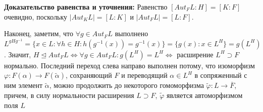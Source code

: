 \par \textbf{Доказательство равенства и уточнения:} \Proof Равенство $[Aut_F L : H] = [K : F]$ очевидно,
поскольку $|Aut_K L|=[L:K]$ и $|Aut_F L| =[L:F]$. 

\par Наконец, заметим, что $\forall g \in Aut_F L$
выполнено $L^{gHg^{-1}}=\{x \in L: \forall h \in H: h(g^{-1}(x))=g^{-1}(x)\}=\{g(x): x\in L^H\} = g(L^H)$. Значит, $H \trianglelefteq Aut_F L \Leftrightarrow \forall g \in Aut_F L: g(L^H)=L^H \Leftrightarrow$ расширение $L^H \supset F$ нормально. Последний переход слева направо выполнен потому, что изоморфизм $\varphi: F(\alpha)\rightarrow F(\tilde{\alpha})$,
сохраняющий $F$ и переводящий $\alpha \in L^H$ в сопряженный с ним элемент $\tilde{\alpha}$, можно продолжить до некоторого гомоморфизма $\tilde{\varphi}:L \rightarrow \overline{F}$, причем, в силу нормальности расширения $L \supset F$, $\tilde{\varphi}$ является автоморфизмом поля $L$ \EndProof
